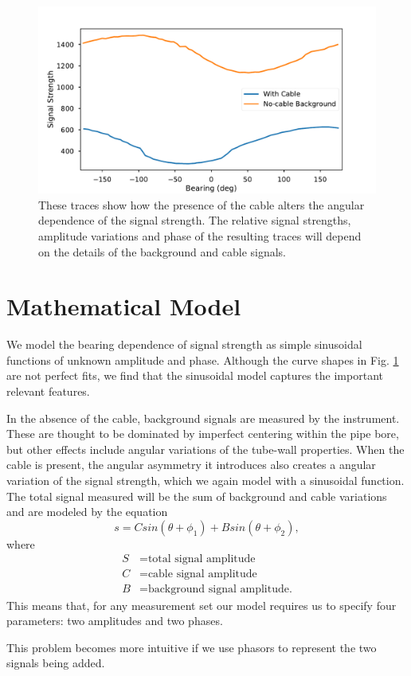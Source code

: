 \documentclass[paper=a4, fontsize=11pt]{scrartcl}
\numberwithin{equation}{section}		%
\numberwithin{figure}{section}			%
\numberwithin{table}{section}				%
\begin{document}
\begin{figure}[h!]
  \caption{These traces show how the presence of the cable alters the angular dependence of the signal strength.  The relative signal strengths, amplitude variations and phase of the resulting traces will depend on the details of the background and cable signals.}
  \label{fig:sample_bearing_trace}
  \centering
  \includegraphics[width=1.0\textwidth]{figures/sample_bearing_trace.pdf}
\end{figure}

\section{Mathematical Model}
We model the bearing dependence of signal strength as simple sinusoidal functions of unknown amplitude and phase.  Although the curve shapes in Fig. \ref{fig:sample_bearing_trace} are not perfect fits, we find that the sinusoidal model captures the important relevant features.
\par In the absence of the cable, background signals are measured by the instrument.  These are thought to be dominated by imperfect centering within the pipe bore, but other effects include angular variations of the tube-wall properties.  When the cable is present, the angular asymmetry it introduces also creates a angular variation of the signal strength, which we again model with a sinusoidal function.  The total signal measured will be the sum of background and cable variations and are modeled by the equation
\begin{equation} \label{eq:trig_sig}
    s = C sin\left(\theta + \phi_1\right) + B sin\left(\theta + \phi_2\right),
\end{equation}
where
\begin{align}
        S &= \text{total signal amplitude} \\
        C &= \text{cable signal amplitude} \\
        B &= \text{background signal amplitude.}
\end{align}
This means that, for any measurement set our model requires us to specify four parameters: two amplitudes and two phases.  \par This problem becomes more intuitive if we use phasors to represent the two signals being added.
\end{document}
